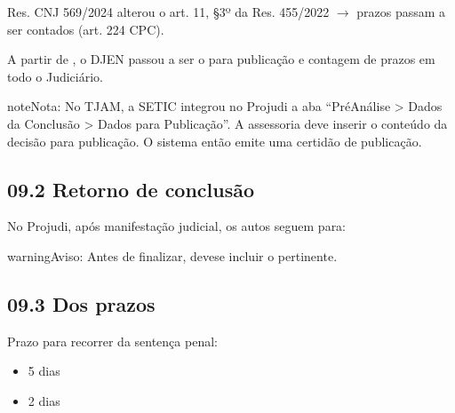 \documentclass[letterpaper,10pt,brazil]{sphinxmanual}
\begin{document}
\sphinxAtStartPar
{}
Res. CNJ 569/2024 alterou o art. 11, \S{}3º da Res. 455/2022 \(\rightarrow\) prazos passam a ser contados  (art. 224 CPC).

\sphinxAtStartPar
{}
A partir de , o DJEN passou a ser o  para publicação e contagem de prazos em todo o Judiciário.

\begin{sphinxadmonition}{note}{Nota:}
\sphinxAtStartPar
No TJAM, a SETIC integrou no Projudi a aba
“Pré\sphinxhyphen{}Análise \textgreater{} Dados da Conclusão \textgreater{} Dados para Publicação”.
A assessoria deve inserir o conteúdo da decisão para publicação.
O sistema então emite uma certidão de publicação.
\end{sphinxadmonition}


\subsection{09.2 \textendash{} Retorno de conclusão}
\label{\detokenize{08_5cienciasentenca:retorno-de-conclusao}}
\sphinxAtStartPar
No Projudi, após manifestação judicial, os autos seguem para:

\sphinxAtStartPar
{}

\begin{sphinxadmonition}{warning}{Aviso:}
\sphinxAtStartPar
Antes de finalizar, deve\sphinxhyphen{}se incluir o  pertinente.
\end{sphinxadmonition}


\subsection{09.3 \textendash{} Dos prazos}
\label{\detokenize{08_5cienciasentenca:dos-prazos}}
\sphinxAtStartPar
Prazo para recorrer da sentença penal:
\begin{itemize}
\item {} 
\sphinxAtStartPar
{} 5 dias

\item {} 
\sphinxAtStartPar
{} 2 dias

\end{itemize}
\end{document}
